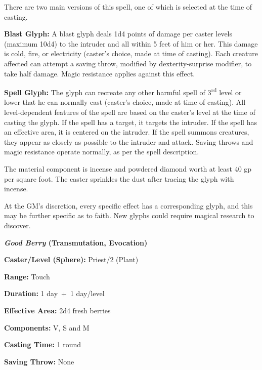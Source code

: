 \begin{multicols}{2}
There are two main versions of this spell, one of which is selected at the time of casting.  

\textbf{Blast Glyph:} A blast glyph deals 1d4 points of damage per caster levels (maximum 10d4) to the intruder and all within 5 feet of him or her.  This damage is cold, fire, or electricity (caster's choice, made at time of casting).  Each creature affected can attempt a saving throw, modified by dexterity-surprise modifier, to take half damage.  Magic resistance applies against this effect.

\textbf{Spell Glyph:} The glyph can recreate any other harmful spell of 3\textsuperscript{rd} level or lower that he can normally cast (caster's choice, made at time of casting).  All level-dependent features of the spell are based on the caster's level at the time of casting the glyph.  If the spell has a target, it targets the intruder.  If the spell has an effective area, it is centered on the intruder.  If the spell summons creatures, they appear as closely as possible to the intruder and attack.  Saving throws and magic resistance operate normally, as per the spell description.

The material component is incense and powdered diamond worth at least 40 gp per square foot. The caster sprinkles the dust after tracing the glyph with incense.  

At the GM's discretion, every specific effect has a corresponding glyph, and this may be further specific as to faith.  New glyphs could require magical research to discover.

\vspace{1em}

\noindent
\begin{minipage}{\columnwidth}

\noindent \textbf{\textit{Good Berry} (Transmutation, Evocation)}

\noindent \textbf{Caster/Level (Sphere):} Priest/2 (Plant)

\noindent \textbf{Range:} Touch

\noindent \textbf{Duration:} 1 day~+~1 day/level

\noindent \textbf{Effective Area:} 2d4 fresh berries

\noindent \textbf{Components:} V, S and M

\noindent \textbf{Casting Time:} 1 round

\noindent \textbf{Saving Throw:} None

\end{minipage}


\end{multicols}

